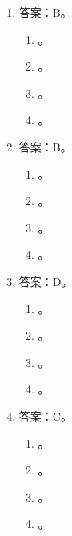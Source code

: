 \begin{enumerate}
\item 答案：B。
	\begin{enumerate}[label=\Alph*.]
	\item 。
	\item 。
	\item 。
	\item 。
	\end{enumerate}

\item 答案：B。
	\begin{enumerate}[label=\Alph*.]
	\item 。
	\item 。
	\item 。
	\item 。
	\end{enumerate}

\item 答案：D。
	\begin{enumerate}[label=\Alph*.]
	\item 。
	\item 。
	\item 。
	\item 。
	\end{enumerate}

\item 答案：C。
	\begin{enumerate}[label=\Alph*.]
	\item 。
	\item 。
	\item 。
	\item 。
	\end{enumerate}


\end{enumerate}
